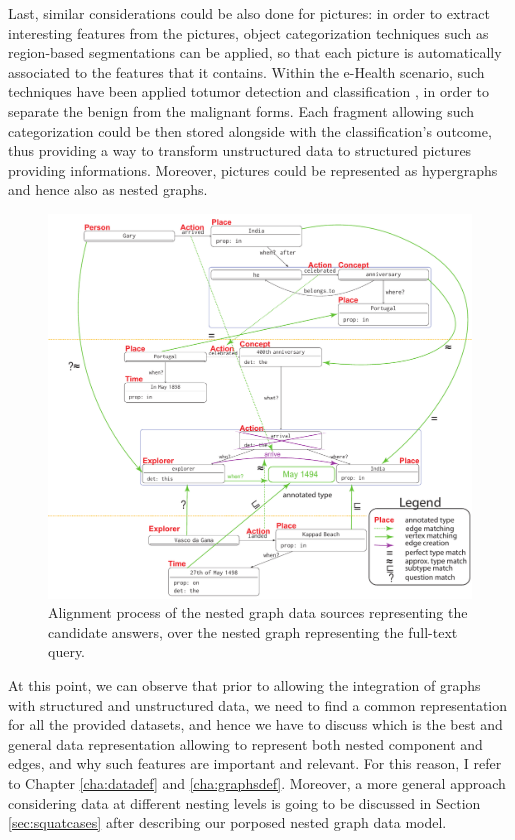 Last, similar considerations could be also done for pictures: in order to extract interesting features from the pictures, object categorization techniques \cite{Galleguillos10} such as region-based segmentations \cite{NIPS2009_3766} can be applied, so that each picture is automatically associated to the features that it contains. Within the e-Health scenario, such techniques have been applied totumor detection and classification \cite{Rouh15,Rouhi16}, in order to separate the benign from the malignant forms. Each fragment allowing such categorization could be then stored alongside with the classification's outcome, thus providing a way to transform unstructured data to structured pictures providing informations. Moreover, pictures could be represented as hypergraphs \cite{Bretto2005} and hence also as nested graphs.

\begin{figure}
	\centering
	\includegraphics[width=.8\textheight]{fig/01dataint/GraphAlignWatson.pdf}
	\caption{Alignment process of the nested graph data sources representing the candidate answers, over the nested graph representing the full-text query.}
	\label{fig:aligninggraphs}
\end{figure}

At this point, we can observe that prior to allowing the integration of graphs with structured and unstructured data, we need to find a common representation for all the provided datasets, and hence we have to discuss which is the best and general data representation allowing to represent both nested component and edges, and why such features are important and relevant. For this reason, I refer to Chapter \vref{cha:datadef} and \vref{cha:graphsdef}. Moreover, a more general approach considering data at different nesting levels is going to be discussed in Section \vref{sec:squatcases} after describing our porposed nested graph data model.

